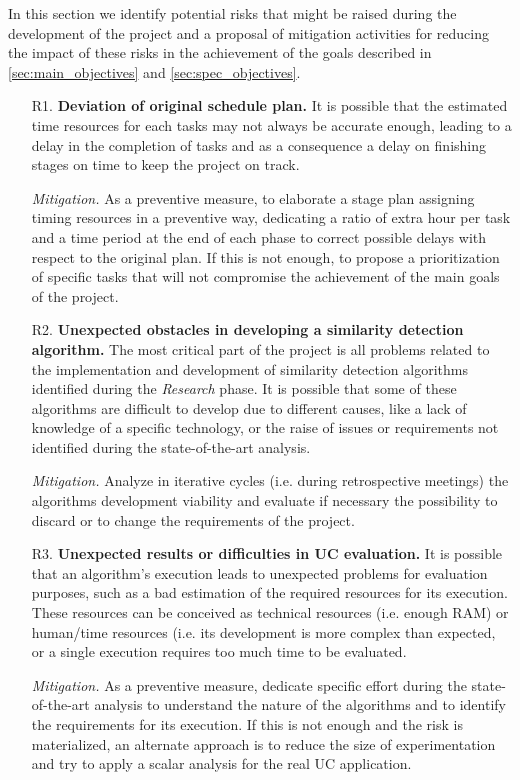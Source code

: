 \documentclass[11pt]{article}
\begin{document}
In this section we identify potential risks that might be raised during the development of the project and a proposal of mitigation activities for reducing the impact of these risks in the achievement of the goals described in \ref{sec:main_objectives} and \ref{sec:spec_objectives}.

\begin{itemize}

\item[R1.] \textbf{Deviation of original schedule plan.} It is possible that the estimated time resources for each tasks may not always be accurate enough, leading to a delay in the completion of tasks and as a consequence a delay on finishing stages on time to keep the project on track.

\textit{Mitigation.} As a preventive measure, to elaborate a stage plan assigning timing resources in a preventive way, dedicating a ratio of extra hour per task and a time period at the end of each phase to correct possible delays with respect to the original plan. If this is not enough, to propose a prioritization of specific tasks that will not compromise the achievement of the main goals of the project.

\item[R2.] \textbf{Unexpected obstacles in developing a similarity detection algorithm.} The most critical part of the project is all problems related to the implementation and development of similarity detection algorithms identified during the \textit{Research} phase. It is possible that some of these algorithms are difficult to develop due to different causes, like a lack of knowledge of a specific technology, or the raise of issues or requirements not identified during the state-of-the-art analysis.

\textit{Mitigation.} Analyze in iterative cycles (i.e. during retrospective meetings) the algorithms development viability and evaluate if necessary the possibility to discard or to change the requirements of the project. 

\item[R3.] \textbf{Unexpected results or difficulties in UC evaluation.} It is possible that an algorithm's execution leads to unexpected problems for evaluation purposes, such as a bad estimation of the required resources for its execution. These resources can be conceived as technical resources (i.e. enough RAM) or human/time resources (i.e. its development is more complex than expected, or a single execution requires too much time to be evaluated.

\textit{Mitigation.} As a preventive measure, dedicate specific effort during the state-of-the-art analysis to understand the nature of the algorithms and to identify the requirements for its execution. If this is not enough and the risk is materialized, an alternate approach is to reduce the size of experimentation and try to apply a scalar analysis for the real UC application.
\end{itemize}
\end{document}
